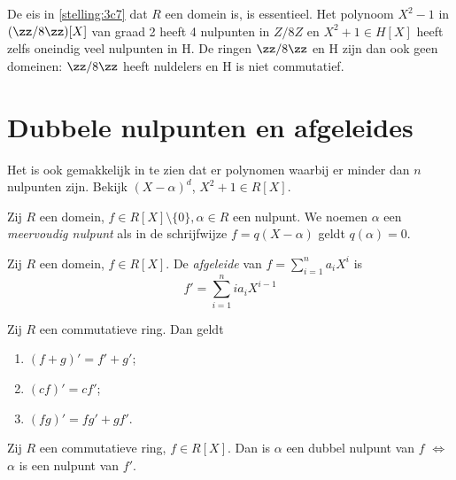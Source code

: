 \documentclass[a4paper,12pt,oneside]{book}
\begin{document}
\begin{opmerking}
De eis in \autoref{stelling:3c7} dat $R$ een domein is, is essentieel. Het polynoom $X^2 -1$ in $(\zz/8\zz)[X]$
van graad 2 heeft 4 nulpunten in $Z/8Z$ en $X^2 + 1 \in H[X]$ heeft zelfs oneindig veel nulpunten in H. De ringen $\zz/8\zz$ en H zijn dan ook geen domeinen: $\zz/8\zz$ heeft nuldelers en H is niet
commutatief.
\end{opmerking}

\section{Dubbele nulpunten en afgeleides}
\begin{opmerking}
Het is ook gemakkelijk in te zien dat er polynomen waarbij er minder dan $n$ nulpunten zijn. Bekijk $(X-\alpha)^d$, $X^2 + 1 \in R[X]$.
\end{opmerking}

\begin{definitie}
Zij $R$ een domein, $f\in R[X] \setminus \{0\}, \alpha \in R$ een nulpunt. We noemen $\alpha$ een \textit{meervoudig nulpunt} als in de schrijfwijze $f=q(X-\alpha)$ geldt $q(\alpha) = 0$. 
\end{definitie}

\begin{definitie}
Zij $R$ een domein, $f\in R[X]$. De \textit{afgeleide} van $f =\sum_{i=1}^n a_iX^i$ 
is
\[
f' = \sum_{i=1}^n i a_iX^{i-1}
\] 
\end{definitie}

\begin{lemma}Zij $R$ een commutatieve ring. Dan geldt
\begin{enumerate}[label=(\roman*)]
\item $(f+g)' = f' + g'$;
\item $(cf)' = cf'$;
\item $(fg)' = fg'+ gf'$.
\end{enumerate}
\end{lemma}

\begin{stelling}
Zij $R$ een commutatieve ring, $f\in R[X]$. Dan is $\alpha$ een dubbel nulpunt van $f$ $\iff$ $\alpha$ is een nulpunt van $f'$.
\end{stelling}
\end{document}
